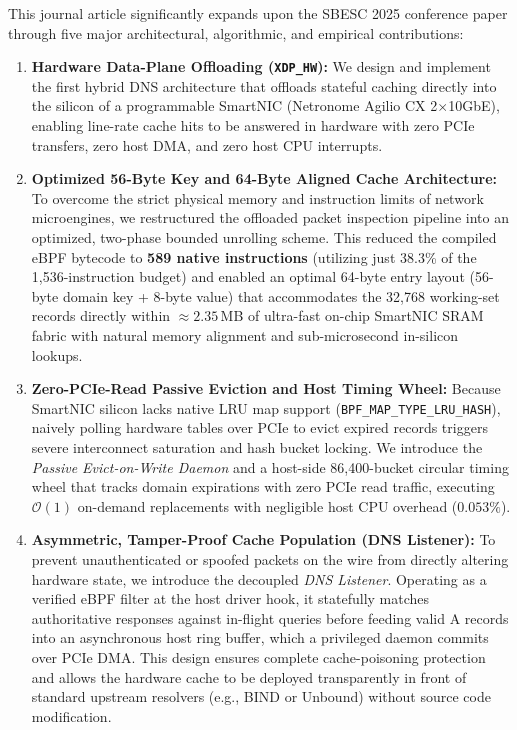 \documentclass[a4paper,fleqn,colorlinks,hidelinks]{cas-sc}
\begin{document}
This journal article significantly expands upon the SBESC 2025 conference paper through five major architectural, algorithmic, and empirical contributions:
\begin{enumerate}
    \item \textbf{Hardware Data-Plane Offloading (\texttt{XDP\_HW}):} We design and implement the first hybrid DNS architecture that offloads stateful caching directly into the silicon of a programmable SmartNIC (Netronome Agilio CX 2$\times$10GbE), enabling line-rate cache hits to be answered in hardware with zero PCIe transfers, zero host DMA, and zero host CPU interrupts.
    \item \textbf{Optimized 56-Byte Key and 64-Byte Aligned Cache Architecture:} To overcome the strict physical memory and instruction limits of network microengines, we restructured the offloaded packet inspection pipeline into an optimized, two-phase bounded unrolling scheme. This reduced the compiled eBPF bytecode to \textbf{589 native instructions} (utilizing just 38.3\% of the 1,536-instruction budget) and enabled an optimal 64-byte entry layout (56-byte domain key + 8-byte value) that accommodates the 32,768 working-set records directly within $\approx 2.35$\,MB of ultra-fast on-chip SmartNIC SRAM fabric with natural memory alignment and sub-microsecond in-silicon lookups.
    \item \textbf{Zero-PCIe-Read Passive Eviction and Host Timing Wheel:} Because SmartNIC silicon lacks native LRU map support (\texttt{BPF\_MAP\_TYPE\_LRU\_HASH}), naively polling hardware tables over PCIe to evict expired records triggers severe interconnect saturation and hash bucket locking. We introduce the \textit{Passive Evict-on-Write Daemon} and a host-side 86,400-bucket circular timing wheel that tracks domain expirations with zero PCIe read traffic, executing $\mathcal{O}(1)$ on-demand replacements with negligible host CPU overhead ($0.053\%$).
    \item \textbf{Asymmetric, Tamper-Proof Cache Population (DNS Listener):} To prevent unauthenticated or spoofed packets on the wire from directly altering hardware state, we introduce the decoupled \textit{DNS Listener}. Operating as a verified eBPF filter at the host driver hook, it statefully matches authoritative responses against in-flight queries before feeding valid A records into an asynchronous host ring buffer, which a privileged daemon commits over PCIe DMA. This design ensures complete cache-poisoning protection and allows the hardware cache to be deployed transparently in front of standard upstream resolvers (e.g., BIND or Unbound) without source code modification.

\end{enumerate}
\end{document}
